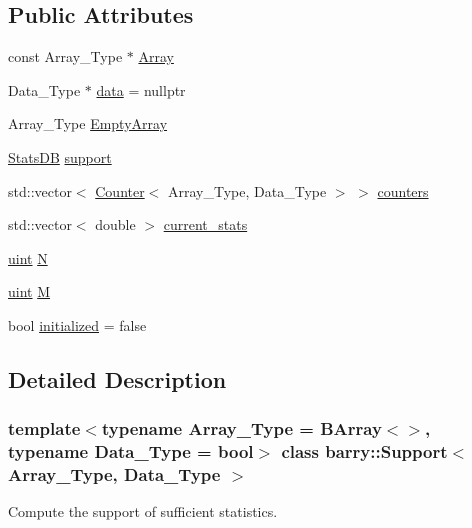 \subsection*{Public Attributes}
\begin{DoxyCompactItemize}
\item 
const Array\+\_\+\+Type $\ast$ \hyperlink{classbarry_1_1_support_a782b1912d7fa2963d79d48a50947f033}{Array}
\item 
Data\+\_\+\+Type $\ast$ \hyperlink{classbarry_1_1_support_ad53c81c95b0a30ec2cea7e7e88774c0c}{data} = nullptr
\item 
Array\+\_\+\+Type \hyperlink{classbarry_1_1_support_ae26e46356041286028ffcc27195b9e8a}{Empty\+Array}
\item 
\hyperlink{classbarry_1_1_stats_d_b}{Stats\+DB} \hyperlink{classbarry_1_1_support_ac9942324040dfed9e0f2347b4d9d25b3}{support}
\item 
std\+::vector$<$ \hyperlink{classbarry_1_1_counter}{Counter}$<$ Array\+\_\+\+Type, Data\+\_\+\+Type $>$ $>$ \hyperlink{classbarry_1_1_support_a9615cb720931f81b57d5caa272b969ab}{counters}
\item 
std\+::vector$<$ double $>$ \hyperlink{classbarry_1_1_support_a094f0851c7d6bfa7876eb0df2be4439e}{current\+\_\+stats}
\item 
\hyperlink{namespacebarry_a11dfc53ddb4672278319aa04f1e09a6c}{uint} \hyperlink{classbarry_1_1_support_a1e3158ceae716505cb0c5fb14374be9b}{N}
\item 
\hyperlink{namespacebarry_a11dfc53ddb4672278319aa04f1e09a6c}{uint} \hyperlink{classbarry_1_1_support_aaceb2f83d235c70034e089087991cff8}{M}
\item 
bool \hyperlink{classbarry_1_1_support_a737bc10d6a6e4e3b18aeef0228bd45bb}{initialized} = false
\end{DoxyCompactItemize}


\subsection{Detailed Description}
\subsubsection*{template$<$typename Array\+\_\+\+Type = B\+Array$<$$>$, typename Data\+\_\+\+Type = bool$>$\newline
class barry\+::\+Support$<$ Array\+\_\+\+Type, Data\+\_\+\+Type $>$}

Compute the support of sufficient statistics. 

